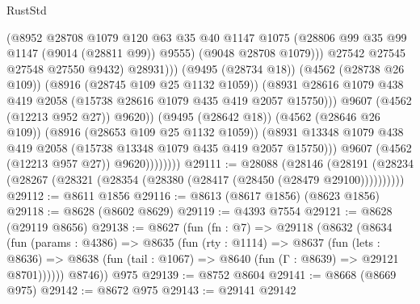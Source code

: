 \begin{lexlean}{RustStd}
\begin{coremodule}
                                      (@8952
                                        @28708
                                        @1079
                                        @120
                                        @63
                                        @35
                                        @40
                                        @1147
                                        @1075
                                        (@28806 @99 @35 @99 @1147 (@9014 (@28811 @99)) @9555)
                                        (@9048 @28708 @1079)))
                                    @27542
                                    @27545
                                    @27548
                                    @27550
                                    @9432)
                                  @28931)))
                            (@9495 (@28734 @18))
                            (@4562 (@28738 @26 @109))
                            (@8916 (@28745 @109 @25 @1132 @1059))
                            (@8931
                              @28616
                              @1079
                              @438
                              @419
                              @2058
                              (@15738 @28616 @1079 @435 @419 @2057 @15750)))
                          @9607
                          (@4562 (@12213 @952 @27))
                          @9620))
                      (@9495 (@28642 @18))
                      (@4562 (@28646 @26 @109))
                      (@8916 (@28653 @109 @25 @1132 @1059))
                      (@8931
                        @13348
                        @1079
                        @438
                        @419
                        @2058
                        (@15738 @13348 @1079 @435 @419 @2057 @15750)))
                    @9607
                    (@4562 (@12213 @957 @27))
                    @9620))))))))
@29111 := @28088
    (@28146 (@28191 (@28234 (@28267 (@28321 (@28354 (@28380 (@28417 (@28450 (@28479 @29100))))))))))
@29112 := @8611 @1856
@29116 := @8613 (@8617 @1856) (@8623 @1856)
@29118 := @8628 (@8602 @8629)
@29119 := @4393 @7554
@29121 := @8628 (@29119 @8656)
@29138 := @8627
    (fun (fn : @7) =>
    @29118
      (@8632
        (@8634
          (fun (params : @4386) =>
          @8635
            (fun (rty : @1114) =>
            @8637
              (fun (lets : @8636) =>
              @8638 (fun (tail : @1067) => @8640 (fun (Γ : @8639) => @29121 @8701))))))
        @8746))
    @975
@29139 := @8752 @8604
@29141 := @8668 (@8669 @975)
@29142 := @8672 @975
@29143 := @29141 @29142

\end{coremodule}
\end{lexlean}
